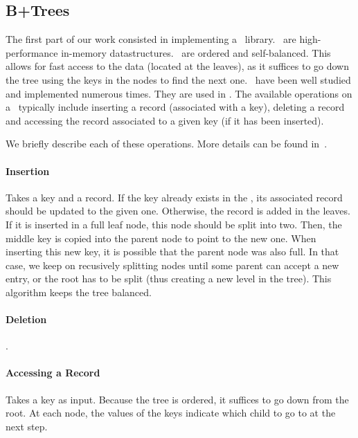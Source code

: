 \subsection{B+Trees}
The first part of our work consisted in implementing a \btrees\ library.
\btrees\ are high-performance in-memory datastructures. \btrees\ are ordered and self-balanced.
This allows for fast access to the data (located at the leaves), as it suffices to go down the tree using the keys in the nodes to find the next one.
\btrees\ have been well studied  and implemented numerous times. They are used in .
The available operations on a \btree\ typically include inserting a record (associated with a key), deleting a record and accessing the record associated to a given key (if it has been inserted).

We briefly describe each of these operations. More details can be found in~\cite{dbms}.
\paragraph{Insertion} Takes a key and a record.
If the key already exists in the \btree, its associated record should be updated to the given one. Otherwise, the record is added in the leaves.
If it is inserted in a full leaf node, this node should be split into two. Then, the middle key is copied into the parent node to point to the new one.
When inserting this new key, it is possible that the parent node was also full.
In that case, we keep on recusively splitting nodes until some parent can accept a new entry, or the root has to be split (thus creating a new level in the tree).
This algorithm keeps the tree balanced.
 
\paragraph{Deletion} . 
\paragraph{Accessing a Record} Takes a key as input. Because the tree is ordered, it suffices to go down from the root.
At each node, the values of the keys indicate which child to go to at the next step.  

